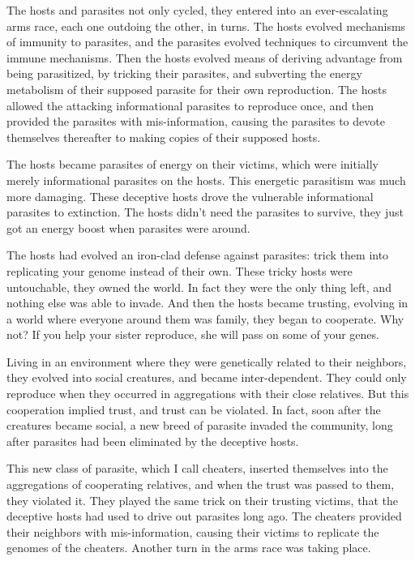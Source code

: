 The hosts and parasites not only cycled, they entered into an ever-escalating
arms race, each one outdoing the other, in turns.  The hosts evolved
mechanisms of immunity to parasites, and the parasites evolved techniques
to circumvent the immune mechanisms.  Then the hosts evolved means of
deriving advantage from being parasitized, by tricking their parasites,
and subverting the energy metabolism of their supposed parasite for their
own reproduction.  The hosts allowed the attacking informational parasites
to reproduce once, and then provided the parasites with mis-information,
causing the parasites to devote themselves thereafter to making copies of
their supposed hosts.

The hosts became parasites of energy on their victims, which were initially
merely informational parasites on the hosts.  This energetic parasitism was
much more damaging.  These deceptive hosts drove the vulnerable informational
parasites to extinction.  The hosts didn't need the parasites to survive,
they just got an energy boost when parasites were around.

The hosts had evolved an iron-clad defense against parasites: trick them into
replicating your genome instead of their own.  These tricky hosts were
untouchable, they owned the world.  In fact they were the only thing left, and
nothing else was able to invade.  And then the hosts became trusting, evolving
in a world where everyone around them was family, they began to cooperate.
Why not?  If you help your sister reproduce, she will pass on some of your
genes.

Living in an environment where they were genetically related to their
neighbors, they evolved into social creatures, and became inter-dependent.
They could only reproduce when they occurred in aggregations with their
close relatives.  But this cooperation implied trust, and trust can be
violated.  In fact, soon after the creatures became social, a new breed
of parasite invaded the community, long after parasites had been eliminated
by the deceptive hosts.

This new class of parasite, which I call cheaters, inserted themselves into
the aggregations of cooperating relatives, and when the trust was passed to
them, they violated it.  They played the same trick on their trusting victims,
that the deceptive hosts had used to drive out parasites long ago.  The
cheaters provided their neighbors with mis-information, causing their
victims to replicate the genomes of the cheaters.  Another turn in the arms
race was taking place.

